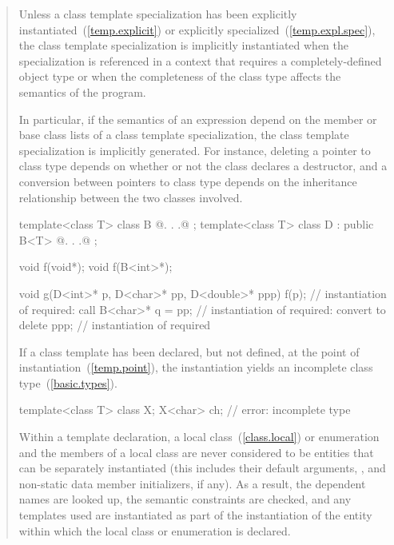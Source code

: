 \begin{quote}
\pnum
Unless a class template specialization has been explicitly
instantiated~(\ref{temp.explicit}) or explicitly
specialized~(\ref{temp.expl.spec}),
the class template specialization is implicitly instantiated when the
specialization is referenced in a context that requires a completely-defined
object type or when the completeness of the class type affects the semantics
of the program.
\begin{note}
In particular, if the semantics of an expression depend on the member or
base class lists of a class template specialization, the class template
specialization is implicitly generated. For instance, deleting a pointer
to class type depends on whether or not the class declares a destructor,
and a conversion between pointers to class type depends on the
inheritance relationship between the two classes involved.
\end{note}
\enterexample
\begin{codeblock}
template<class T> class B { @. . .@ };
template<class T> class D : public B<T> { @. . .@ };

void f(void*);
void f(B<int>*);

void g(D<int>* p, D<char>* pp, D<double>* ppp) {
  f(p);             // instantiation of  required: call 
  B<char>* q = pp;  // instantiation of  required: convert  to 
  delete ppp;       // instantiation of  required
}
\end{codeblock}
\exitexample
If a class template has been declared, but not defined,
at the point of instantiation~(\ref{temp.point}),
the instantiation yields an incomplete class type~(\ref{basic.types}).
\enterexample
\begin{codeblock}
template<class T> class X;
X<char> ch;         // error: incomplete type 
\end{codeblock}
\exitexample
\begin{note}
Within a template declaration,
a local class~(\ref{class.local}) or enumeration and the members of
a local class are never considered to be entities that can be separately
instantiated (this includes their default arguments, 
, and non-static data member
initializers, if any). As a result, the dependent names are looked up, the
semantic constraints are checked, and any templates used are instantiated as
part of the instantiation of the entity within which the local class or
enumeration is declared.
\end{note}
\end{quote}


